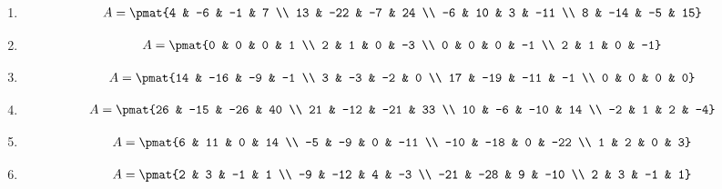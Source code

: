 \begin{enumerate}
\item

\begin{align*}
A = \pmat{4 & -6 & -1 & 7 \\ 13 & -22 & -7 & 24 \\ -6 & 10 & 3 & -11 \\ 8 & -14 & -5 & 15}
\end{align*}

\item

\begin{align*}
A = \pmat{0 & 0 & 0 & 1 \\ 2 & 1 & 0 & -3 \\ 0 & 0 & 0 & -1 \\ 2 & 1 & 0 & -1}
\end{align*}

\item

\begin{align*}
A = \pmat{14 & -16 & -9 & -1 \\ 3 & -3 & -2 & 0 \\ 17 & -19 & -11 & -1 \\ 0 & 0 & 0 & 0}
\end{align*}

\item

\begin{align*}
A = \pmat{26 & -15 & -26 & 40 \\ 21 & -12 & -21 & 33 \\ 10 & -6 & -10 & 14 \\ -2 & 1 & 2 & -4}
\end{align*}

\item

\begin{align*}
A = \pmat{6 & 11 & 0 & 14 \\ -5 & -9 & 0 & -11 \\ -10 & -18 & 0 & -22 \\ 1 & 2 & 0 & 3}
\end{align*}

\item

\begin{align*}
A = \pmat{2 & 3 & -1 & 1 \\ -9 & -12 & 4 & -3 \\ -21 & -28 & 9 & -10 \\ 2 & 3 & -1 & 1}
\end{align*}


\end{enumerate}
